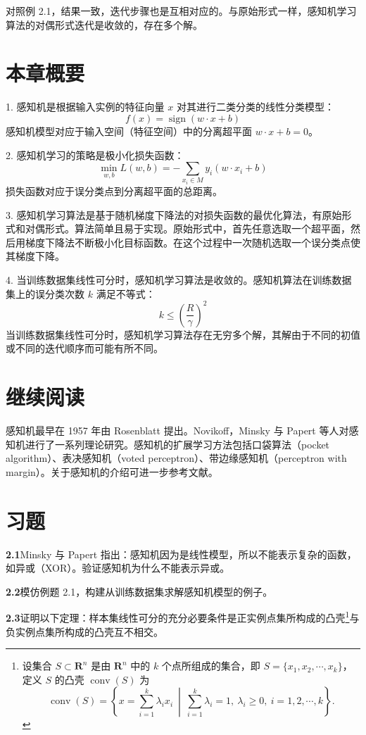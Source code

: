 \documentclass[UTF8, 12pt, fontset=fandol, oneside]{ctexart}
\begin{document}
对照例 2.1，结果一致，迭代步骤也是互相对应的。与原始形式一样，感知机学习算法的对偶形式迭代是收敛的，存在多个解。

\section*{本章概要}

1. 感知机是根据输入实例的特征向量 $x$ 对其进行二类分类的线性分类模型：
\[
  f(x)=\operatorname{sign}(w\cdot x+b)
\]
感知机模型对应于输入空间（特征空间）中的分离超平面 $w\cdot x+b=0$。

2. 感知机学习的策略是极小化损失函数：
\[
  \min_{w,b}L(w,b)=-\sum_{x_i\in M}y_i(w\cdot x_i+b)
\]
损失函数对应于误分类点到分离超平面的总距离。

3. 感知机学习算法是基于随机梯度下降法的对损失函数的最优化算法，有原始形式和对偶形式。算法简单且易于实现。原始形式中，首先任意选取一个超平面，然后用梯度下降法不断极小化目标函数。在这个过程中一次随机选取一个误分类点使其梯度下降。

4. 当训练数据集线性可分时，感知机学习算法是收敛的。感知机算法在训练数据集上的误分类次数 $k$ 满足不等式：
\[
  k\le\left(\frac{R}{\gamma}\right)^2
\]
当训练数据集线性可分时，感知机学习算法存在无穷多个解，其解由于不同的初值或不同的迭代顺序而可能有所不同。

\section*{继续阅读}

感知机最早在 1957 年由 Rosenblatt 提出。Novikoff，Minsky 与 Papert 等人对感知机进行了一系列理论研究。感知机的扩展学习方法包括口袋算法（pocket algorithm）、表决感知机（voted perceptron）、带边缘感知机（perceptron with margin）。关于感知机的介绍可进一步参考文献。

\section*{习题}

\noindent\textbf{2.1}\quad Minsky 与 Papert 指出：感知机因为是线性模型，所以不能表示复杂的函数，如异或（XOR）。验证感知机为什么不能表示异或。

\noindent\textbf{2.2}\quad 模仿例题 2.1，构建从训练数据集求解感知机模型的例子。

\noindent\textbf{2.3}\quad 证明以下定理：样本集线性可分的充分必要条件是正实例点集所构成的凸壳\footnote{设集合 $S\subset\mathbf{R}^n$ 是由 $\mathbf{R}^n$ 中的 $k$ 个点所组成的集合，即 $S=\{x_1,x_2,\cdots,x_k\}$，定义 $S$ 的凸壳 $\operatorname{conv}(S)$ 为
\[
  \operatorname{conv}(S)=\left\{x=\sum_{i=1}^k\lambda_ix_i\ \middle|\ \sum_{i=1}^k\lambda_i=1,\ \lambda_i\ge 0,\ i=1,2,\cdots,k\right\}.
\]}与负实例点集所构成的凸壳互不相交。
\end{document}
